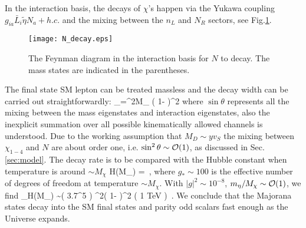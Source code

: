 \documentclass[aps,prd,preprint,nofootinbib]{revtex4}
\begin{document}
In the interaction basis, the decays of $\chi$'s happen via the Yukawa coupling
$ g_{ia}\bar{L}_i \tilde{\eta}N_a +h.c.$  and the mixing between
the $n_L$ and $N_R$ sectors, see Fig.\ref{fig:NDecay}.
\begin{figure}[htb]
\centering
\texttt{[image: N\_decay.eps]}
\caption{ The Feynman diagram in the interaction basis for $N$ to decay.
The mass states are indicated in the parentheses.
\label{fig:NDecay} }
\end{figure}
The final state SM lepton can be treated massless and the decay width can be carried out
straightforwardly:
\beq \Gamma_\chi =\times \sin^2\theta \times M_{\chi} \left( 1- 
\right)^2
\eeq
where  $\sin\theta$ represents all the mixing
between the mass eigenstates and interaction eigenstates, also the
inexplicit summation over all possible kinematically allowed
channels is understood.   Due to the working assumption that
$M_D\sim y v_S$ the mixing between $\chi_{1-4}$ and $N$ are about
order one, i.e. $\sin^2\theta \sim {\cal O}(1)$, as discussed in
Sec.\ref{sec:model}. The decay rate is to be compared with  the Hubble
constant when temperature is around $\sim M_\chi$
\beq
H(M_\chi) =
 \,,
\eeq
where $g_*\sim 100$ is the effective number of degrees of freedom
at temperature $\sim M_\chi$. With $|g|^2 \sim 10^{-8}$, $m_\eta /
M_\chi \sim {\cal O}(1)$, we find
\beq
\label{eq:equiv} {
\Gamma_\chi \over H(M_\chi) } \sim \left( 3.7^5 \right)
\cdot \sin^2\theta \cdot \left( 1- 
\right)^2 \cdot \left( { 1 \mbox{TeV} } \right) \,.
\eeq
We conclude that the Majorana states decay into the SM final
states and  parity odd scalars fast enough as the Universe
expands.
\end{document}
